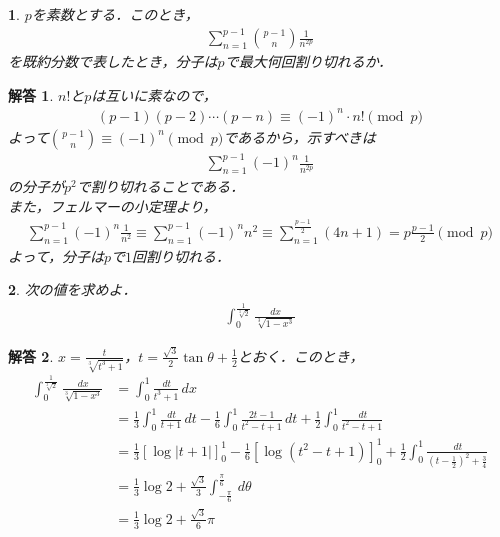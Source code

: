 \documentclass[dvipdfmx]{jsarticle}
\newtheorem*{answer*}{解答}
\newtheorem{prob}{}[]
\begin{document}
\begin{screen}
\begin{prob}
   $p$を素数とする．このとき，
\begin{align*}
  \sum_{n=1}^{p-1}\binom{p-1}{n}\frac{1}{n^{2p}} 
\end{align*}
  を既約分数で表したとき，分子は$p$で最大何回割り切れるか． 
\end{prob}
\end{screen}
\begin{answer*}
  $n!$と$p$は互いに素なので，
  \begin{align*}
    (p-1)(p-2)\cdots (p-n)\equiv (-1)^n\cdot n! \pmod{p}
  \end{align*}
  よって$\binom{p-1}{n}\equiv (-1)^n\pmod{p}$であるから，示すべきは
  \begin{align*}
    \sum_{n=1}^{p-1}(-1)^n\frac{1}{n^{2p}} 
  \end{align*}
  の分子が$p^2$で割り切れることである．\\
  また，フェルマーの小定理より，
  \begin{align*}
    \sum_{n=1}^{p-1}(-1)^n\frac{1}{n^{2}}
    \equiv \sum_{n=1}^{p-1}(-1)^nn^2 
    \equiv \sum_{n=1}^{\frac{p-1}{2}}\left(4n+1\right)=p\frac{p-1}{2}
    \pmod p 
  \end{align*}
  よって，分子は$p$で$1$回割り切れる．
  \rightline{$\Large{\Box} $}
\end{answer*}

\begin{screen}
  \begin{prob}
    次の値を求めよ．
    \begin{align*}
      \int_{0}^{\frac{1}{\sqrt[3]{2} }}  \frac{\,dx }{\sqrt[3]{1-x^3}}
   \end{align*}
  \end{prob}
\end{screen}
\begin{answer*}
  $x=\frac{t}{\sqrt[3]{t^3+1}}$，$t=\frac{\sqrt{3}}{2}\tan \theta+\frac{1}{2}$とおく．このとき，
  \begin{align*}
    \int_{0}^{\frac{1}{\sqrt[3]{2} }} \frac{\,dx }{\sqrt[3]{1-x^3}} 
    &=\int_{0}^{1}\frac{\,dt}{t^3+1}  \,dx \\
    &=\frac{1}{3}\int_{0}^{1}\frac{\,dt}{t+1}  \,dt -\frac{1}{6}\int_{0}^{1}  \frac{2t-1}{t^2-t+1}\,dt +\frac{1}{2}\int_{0}^{1}  \frac{\,dt }{t^2-t+1}\\   
    &=\frac{1}{3}\left[\log {\left\lvert t+1\right\rvert }\right]_{0}^{1} -\frac{1}{6}\left[\log \left(t^2-t+1\right)\right]_{0}^{1} + \frac{1}{2}\int_{0}^{1}  \frac{\,dt }{\left(t-\frac{1}{2}\right)^2+\frac{3}{4}}\\
    &=\frac{1}{3}\log {2}+\frac{\sqrt{3}}{3}\int_{-\frac{\pi}{6}}^{\frac{\pi}{6}}  \,d\theta \\
    &=\frac{1}{3}\log {2}+\frac{\sqrt{3}}{6}\pi
  \end{align*}
  \rightline{$\Box $}
\end{answer*}
\newpage
\end{document}

